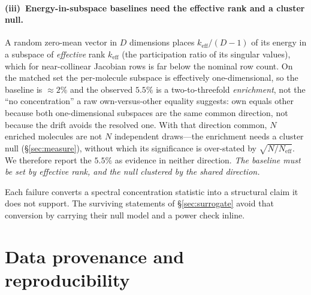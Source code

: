 \paragraph{(iii)~Energy-in-subspace baselines need the effective rank and a cluster null.} A random zero-mean
vector in $D$ dimensions places $k_{\mathrm{eff}}/(D{-}1)$ of its energy in a subspace of \emph{effective}
rank $k_{\mathrm{eff}}$ (the participation ratio of its singular values), which for near-collinear Jacobian
rows is far below the nominal row count. On the matched set the per-molecule subspace is effectively
one-dimensional, so the baseline is ${\approx}2\%$ and the observed $5.5\%$ is a two-to-threefold
\emph{enrichment}, not the ``no concentration'' a raw own-versus-other equality suggests: own equals other
because both one-dimensional subspaces are the same common direction, not because the drift avoids the
resolved one. With that direction common, $N$ enriched molecules are not $N$ independent draws---the
enrichment needs a cluster null (\S\ref{sec:measure}), without which its significance is over-stated by
$\sqrt{N/N_{\mathrm{eff}}}$. We therefore report the $5.5\%$ as evidence in neither direction. \emph{The
baseline must be set by effective rank, and the null clustered by the shared direction.}

Each failure converts a spectral concentration statistic into a structural claim it does not support.
The surviving statements of \S\ref{sec:surrogate} avoid that conversion by carrying their null model
and a power check inline.



\section{Data provenance and reproducibility}
\label{sec:si-repro}

